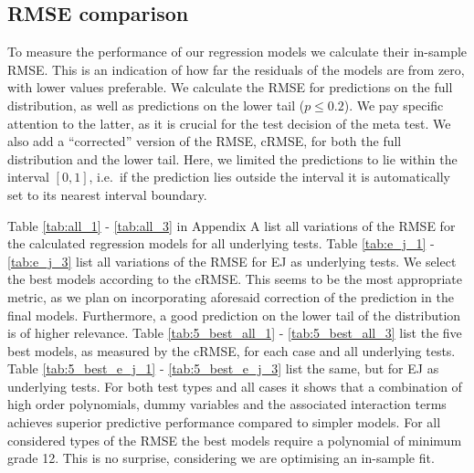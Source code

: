 \documentclass[12pt,a4paper]{article}
\begin{document}
\hypertarget{rmse-comparison}{%
\subsection{RMSE comparison}\label{rmse-comparison}}

To measure the performance of our regression models we calculate their
in-sample \ac{RMSE}. This is an indication of how far the residuals of
the models are from zero, with lower values preferable. We calculate the
\ac{RMSE} for predictions on the full distribution, as well as
predictions on the lower tail (\(p \leq 0.2\)). We pay specific
attention to the latter, as it is crucial for the test decision of the
meta test. We also add a ``corrected'' version of the \ac{RMSE},
\ac{cRMSE}, for both the full distribution and the lower tail. Here, we
limited the predictions to lie within the interval \([0, 1]\), i.e.~if
the prediction lies outside the interval it is automatically set to its
nearest interval boundary.

Table \ref{tab:all_1} - \ref{tab:all_3} in Appendix A list all
variations of the \ac{RMSE} for the calculated regression models for all
underlying tests. Table \ref{tab:e_j_1} - \ref{tab:e_j_3} list all
variations of the \ac{RMSE} for EJ as underlying tests. We select the
best models according to the \ac{cRMSE}. This seems to be the most
appropriate metric, as we plan on incorporating aforesaid correction of
the prediction in the final models. Furthermore, a good prediction on
the lower tail of the distribution is of higher relevance. Table
\ref{tab:5_best_all_1} - \ref{tab:5_best_all_3} list the five best
models, as measured by the \ac{cRMSE}, for each case and all underlying
tests. Table \ref{tab:5_best_e_j_1} - \ref{tab:5_best_e_j_3} list the
same, but for EJ as underlying tests. For both test types and all cases
it shows that a combination of high order polynomials, dummy variables
and the associated interaction terms achieves superior predictive
performance compared to simpler models. For all considered types of the
\ac{RMSE} the best models require a polynomial of minimum grade 12. This
is no surprise, considering we are optimising an in-sample fit.
\end{document}
